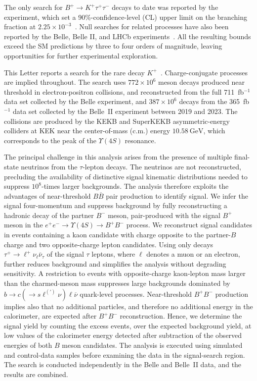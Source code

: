 The only search for $B^{+} \to K^{+} \tau^{+} \tau ^{-}$ decays to date was reported by the \babar{} experiment, which set a 90\%-confidence-level (CL) upper limit on the branching fraction at $2.25 \times 10^{-3}$~\cite{BaBar:2016wgb}. Null searches for related processes have also been reported by the Belle, Belle II, and LHCb experiments~\cite{Belle:2021ecr,LHCb:2017myy, Belleii:moneta, LHCb:2026kstt}. All the resulting bounds exceed the SM predictions by three to four orders of magnitude, leaving opportunities for further experimental exploration.

This Letter reports a search for the rare decay \Bp\to$K^{+}$\tautau~\cite{Vobbilisetti:2023fnz, debjit:thesis}. Charge-conjugate processes are implied throughout. The search uses $772 \times 10^6$ \FourS meson decays produced near threshold in electron-positron collisions, and reconstructed from the full  711~fb$^{-1}$ data set collected by the Belle experiment, and $387\times 10^6$ \FourS decays from the 365~fb$^{-1}$ data set collected by the Belle~II experiment between 2019 and 2023. The collisions are produced by the KEKB and SuperKEKB asymmetric-energy colliders at KEK near the center-of-mass (c.m.) energy $10.58~\mathrm{GeV}$, which corresponds to the peak of the $\Upsilon(4 S)$ resonance.

The principal challenge in this analysis arises from the presence of multiple final-state neutrinos from the $\tau$-lepton decays. The neutrinos are not reconstructed, precluding the availability of distinctive signal kinematic distributions needed to suppress $10^8$-times larger backgrounds. The analysis therefore exploits the advantages of near-threshold $B\overline{B}$ pair production to identify signal.  We infer the signal four-momentum and suppress background by fully reconstructing a hadronic decay of the partner $B^-$ meson, pair-produced with the signal $B^+$ meson in the $e^{+} e^{-} \rightarrow \Upsilon(4 S) \rightarrow B^+ B^-$ process.  We reconstruct signal candidates in events containing a kaon candidate with charge opposite to the partner-$B$ charge and two opposite-charge lepton candidates. Using only decays $\tau^+\to \ell^+ \nu_{\ell} \bar{\nu}_{\tau}$  of the signal $\tau$ leptons, where $\ell$ denotes a muon or an electron, further reduces background and simplifies the analysis without degrading sensitivity.  A restriction to events with opposite-charge kaon-lepton mass larger than the charmed-meson mass suppresses large backgrounds dominated by $b \to c (\to s \ell^{(\prime)}\nu)  \ell \overline{\nu}$ quark-level processes.  Near-threshold $B^+B^-$ production implies also that no additional particles, and therefore no additional energy in the calorimeter, are expected after $B^+B^-$ reconstruction. Hence, we determine the signal yield by counting the excess events, over the expected background yield, at low values of the calorimeter energy detected after subtraction of the observed energies of both $B$ meson candidates. The analysis is executed using simulated and control-data samples before examining the data in the signal-search region. The search is conducted independently in the Belle and Belle~II data, and the results are combined.



